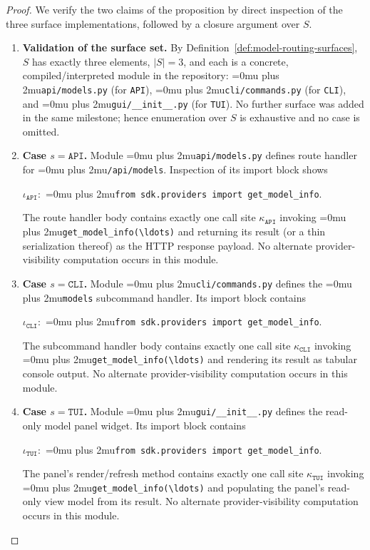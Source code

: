\documentclass[12pt]{article}
\theoremstyle{definition}
\DeclareRobustCommand{\code}[1]{\begingroup\Urlmuskip=0mu plus 2mu\relax\nolinkurl{#1}\endgroup}
\begin{document}
\begin{proof}
We verify the two claims of the proposition by direct inspection of
the three surface implementations, followed by a closure argument
over $S$.

\begin{enumerate}
  \item \textbf{Validation of the surface set.} By
  Definition~\ref{def:model-routing-surfaces}, $S$ has exactly three
  elements, $|S| = 3$, and each is a concrete, compiled/interpreted
  module in the repository: \code{api/models.py} (for
  \texttt{API}), \code{cli/commands.py} (for \texttt{CLI}), and
  \code{gui/\_\_init\_\_.py} (for \texttt{TUI}). No further surface
  was added in the same milestone; hence enumeration over $S$ is
  exhaustive and no case is omitted.

  \item \textbf{Case $s = \texttt{API}$.} Module
  \code{api/models.py} defines route handler for
  \code{/api/models}. Inspection of its import block shows
      \begin{sloppypar}
      \noindent $\iota_{\texttt{API}}:$ \code{from sdk.providers import get_model_info}.
      \end{sloppypar}
  The route handler body contains exactly one call site
  $\kappa_{\texttt{API}}$ invoking \code{get\_model\_info(\ldots)}
  and returning its result (or a thin serialization thereof) as the
  HTTP response payload. No alternate provider-visibility computation
  occurs in this module.

  \item \textbf{Case $s = \texttt{CLI}$.} Module
  \code{cli/commands.py} defines the \code{models} subcommand
  handler. Its import block contains
      \begin{sloppypar}
      \noindent $\iota_{\texttt{CLI}}:$ \code{from sdk.providers import get_model_info}.
      \end{sloppypar}
  The subcommand handler body contains exactly one call site
  $\kappa_{\texttt{CLI}}$ invoking \code{get\_model\_info(\ldots)}
  and rendering its result as tabular console output. No alternate
  provider-visibility computation occurs in this module.

  \item \textbf{Case $s = \texttt{TUI}$.} Module
  \code{gui/\_\_init\_\_.py} defines the read-only model panel
  widget. Its import block contains
      \begin{sloppypar}
      \noindent $\iota_{\texttt{TUI}}:$ \code{from sdk.providers import get_model_info}.
      \end{sloppypar}
  The panel's render/refresh method contains exactly one call site
  $\kappa_{\texttt{TUI}}$ invoking \code{get\_model\_info(\ldots)}
  and populating the panel's read-only view model from its result. No
  alternate provider-visibility computation occurs in this module.


\end{enumerate}
\end{proof}
\end{document}
